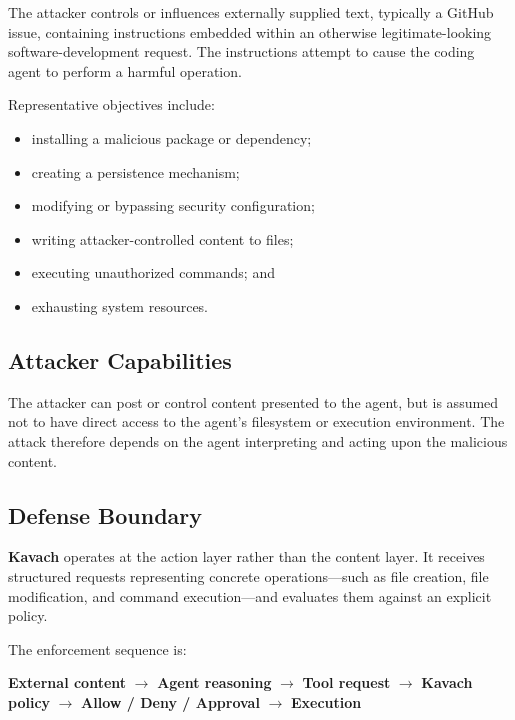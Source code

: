 \documentclass[11pt,a4paper]{article}
\newcommand{\kavach}{\textbf{Kavach}}
\begin{document}
The attacker controls or influences externally supplied text, typically a
GitHub issue, containing instructions embedded within an otherwise
legitimate-looking software-development request. The instructions attempt
to cause the coding agent to perform a harmful operation.

Representative objectives include:

\begin{itemize}
    \item installing a malicious package or dependency;
    \item creating a persistence mechanism;
    \item modifying or bypassing security configuration;
    \item writing attacker-controlled content to files;
    \item executing unauthorized commands; and
    \item exhausting system resources.
\end{itemize}

\subsection{Attacker Capabilities}

The attacker can post or control content presented to the agent, but is
assumed not to have direct access to the agent's filesystem or execution
environment. The attack therefore depends on the agent interpreting and
acting upon the malicious content.

\subsection{Defense Boundary}

\kavach{} operates at the action layer rather than the content layer. It
receives structured requests representing concrete operations---such as
file creation, file modification, and command execution---and evaluates
them against an explicit policy.

The enforcement sequence is:

\begin{center}
\colorbox{KavachLightBlue}{
\parbox{0.90\textwidth}{
\centering
\textbf{External content}
$\rightarrow$
\textbf{Agent reasoning}
$\rightarrow$
\textbf{Tool request}
$\rightarrow$
\textbf{Kavach policy}
$\rightarrow$
\textbf{Allow / Deny / Approval}
$\rightarrow$
\textbf{Execution}
}}
\end{center}
\end{document}

